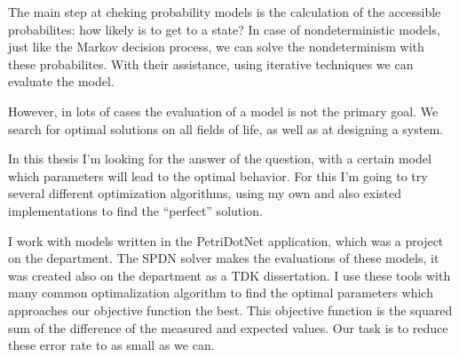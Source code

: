 The main step at cheking probability models is the calculation of the accessible probabilites: how likely is to get to a state? In case of nondeterministic models, just like the Markov decision process, we can solve the nondeterminism with these probabilites. With their assistance, using iterative techniques we can evaluate the model.

However, in lots of cases the evaluation of a model is not the primary goal. We search for optimal solutions on all fields of life, as well as at designing a system.

In this thesis I'm looking for the answer of the question, with a certain model which parameters will lead to the optimal behavior. For this I'm going to try several different optimization algorithms, using my own and also existed implementations to find the ``perfect'' solution.

I work with models written in the PetriDotNet application, which was a project on the department. The SPDN solver makes the evaluations of these models, it was created also on the department as a TDK dissertation. I use these tools with many common optimalization algorithm to find the optimal parameters which approaches our objective function the best. This objective function is the squared sum of the difference of the measured and expected values. Our task is to reduce these error rate to as small as we can.


\vfill
\selectthesislanguage

\setcounter{romanPage}{\value{page}}
